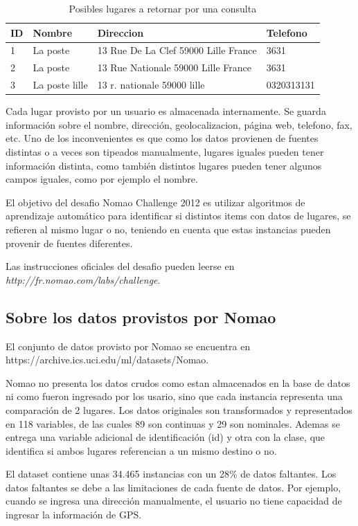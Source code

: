 \documentclass[journal]{IEEEtran}
\begin{document}
\begin{table}[ht!]
\caption{Posibles lugares a retornar por una consulta}
\label{table:example1}
\centering
\begin{tabular}{l | l l l }
ID & Nombre & Direccion & Telefono  \\
\hline
1 & La poste & 13 Rue De La Clef 59000 Lille France & 3631 \\ 
2 & La poste & 13 Rue Nationale 59000 Lille France & 3631 \\
3 & La poste lille & 13 r. nationale 59000 lille & 0320313131 \\
\end{tabular}
\end{table}

Cada lugar provisto por un usuario es almacenada internamente. Se guarda
información sobre el nombre, dirección, geolocalizacion, página web,
telefono, fax, etc. Uno de los inconvenientes es que como los datos
provienen de fuentes distintas o a veces son tipeados manualmente,
lugares iguales pueden tener información distinta, como también
distintos lugares pueden tener algunos campos iguales, como por 
ejemplo el nombre.

El objetivo del desafio Nomao Challenge 2012 es utilizar 
algoritmos de aprendizaje automático para identificar si 
distintos items con datos de lugares, se refieren al mismo
lugar o no, teniendo en cuenta que estas instancias
pueden provenir de fuentes diferentes.

Las instrucciones oficiales del desafio pueden leerse en 
\textit{http://fr.nomao.com/labs/challenge}.

\subsection{Sobre los datos provistos por Nomao}

El conjunto de datos provisto por Nomao se encuentra en
https://archive.ics.uci.edu/ml/datasets/Nomao. 

Nomao no presenta los datos crudos como estan almacenados en la 
base de datos ni como fueron ingresado por los usario, sino que  
cada instancia representa una comparación de 
2 lugares. Los datos originales son transformados y representados
en 118 variables, de las cuales 89 son continuas y 29 son
nominales. Ademas se entrega una variable adicional de identificación (id) y
otra con la clase, que identifica si ambos lugares referencian a un mismo
destino o no. 

El dataset contiene unas 34.465 instancias con un 28\% de datos faltantes.
Los datos faltantes se debe a las limitaciones de cada fuente de datos. Por
ejemplo, cuando se ingresa una dirección manualmente, el usuario no tiene
capacidad de ingresar la información de GPS.
\end{document}
